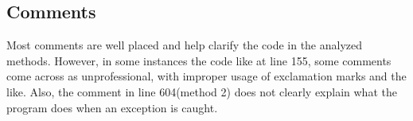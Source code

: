 \subsection{Comments}
Most comments are well placed and help clarify the code in the analyzed methods. However, in some instances the code like at line 155, some comments come across as unprofessional, with
improper usage of exclamation marks and the like. Also, the comment in line 604(method 2) does not clearly explain what the program does when an exception is caught.